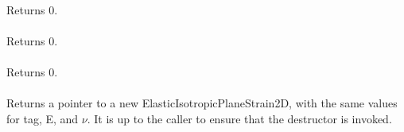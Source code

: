  \\
Returns $0$. \\

 \\
Returns $0$. \\

 \\
Returns $0$. \\

 \\
Returns a pointer to a new ElasticIsotropicPlaneStrain2D, with the
same values for \p tag, \p E, and $\nu$. It is up to the
caller to ensure that the destructor is invoked. \\
